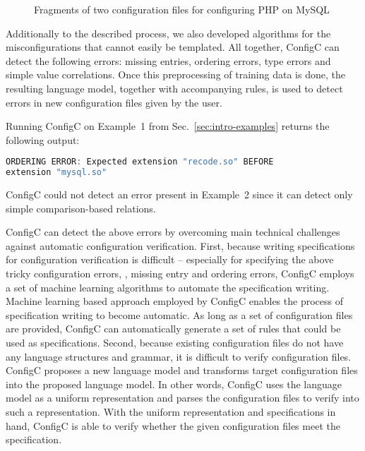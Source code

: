\begin{figure}
	\centering
\begin{minipage}{0.9\textwidth}
\begin{parcolumns}{2}


\colplacechunks
\end{parcolumns}
\end{minipage}
	\caption{Fragments of two configuration files for configuring PHP on MySQL}
	\label{fig:twoFiles}
\end{figure}


Additionally to the described process, we also developed algorithms for 
the misconfigurations that cannot easily be templated. All together, 
ConfigC can detect the following errors:
missing entries, ordering errors, type errors and
simple value correlations. Once this preprocessing of training data is 
done, the resulting language model, 
together with accompanying rules, 
is used to detect errors in new configuration files given by the user.

Running ConfigC on Example~1 from 
Sec.~\ref{sec:intro-examples} returns the following output:
\begin{lstlisting}[language=C, xleftmargin=.01\textwidth]
ORDERING ERROR: Expected extension "recode.so" BEFORE 
extension "mysql.so"
\end{lstlisting} 
ConfigC could not detect an error present in Example~2 since it can detect 
only simple comparison-based relations.

\iffalse

ConfigC can detect the above errors by overcoming 
main technical challenges against automatic configuration verification.
First, because writing specifications for configuration verification
is difficult -- especially for specifying the above
tricky configuration errors, \eg, missing entry and ordering errors,
ConfigC employs a set of machine learning algorithms to
automate the specification writing. Machine learning based approach
employed by ConfigC enables the process of specification writing to become
automatic. As long as a set of configuration files are provided,
ConfigC can automatically generate a set of rules that could be used
as specifications.
Second, because existing configuration files do not have any language
structures and grammar, it is difficult to verify configuration files.
ConfigC proposes a new language model and transforms target configuration
files into the proposed language model. In other words, ConfigC uses
the language model as a uniform representation and parses the 
configuration files to verify into such a representation.
With the uniform representation and specifications in hand,
ConfigC is able to verify whether the given configuration files
meet the specification.

